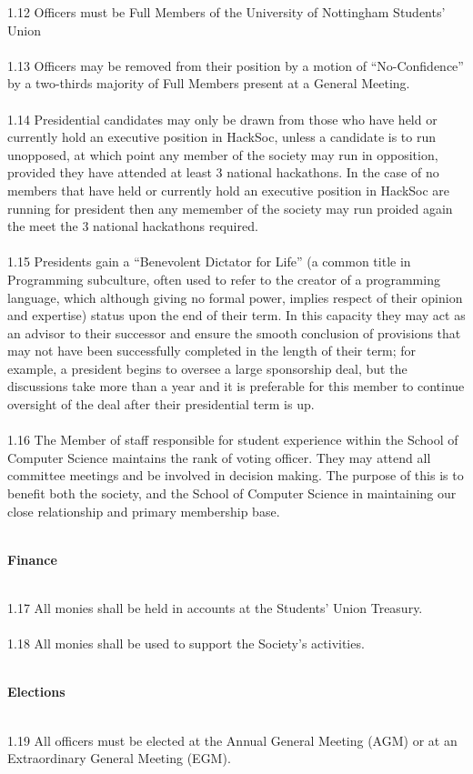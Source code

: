 \documentclass[a4paper,twoside,notitlepage,11pt]{article}
\newcommand{\consHead}[1]{\begin{Large}\textbf{#1}\end{Large}\ \\}
\begin{document}
1.12 Officers must be Full Members of the University of Nottingham Students' Union\ \\
\ \\
1.13 Officers may be removed from their position by a motion of ``No-Confidence'' by a two-thirds majority of Full Members present at a General Meeting.\ \\
\ \\
1.14 Presidential candidates may only be drawn from those who have held or currently hold an executive position in HackSoc, unless a candidate is to run unopposed, at which point any member of the society may run in opposition, provided they have attended at least 3 national hackathons. In the case of no members that have held or currently hold an executive position in HackSoc are running for president then any memember of the society may run proided again the meet the 3 national hackathons required.\ \\
\ \\
1.15 Presidents gain a ``Benevolent Dictator for Life'' (a common title in Programming subculture, often used to refer to the creator of a programming language, which although giving no formal power, implies respect of their opinion and expertise) status upon the end of their term. In this capacity they may act as an advisor to their successor and ensure the smooth conclusion of provisions that may not have been successfully completed in the length of their term; for example, a president begins to oversee a large sponsorship deal, but the discussions take more than a year and it is preferable for this member to continue oversight of the deal after their presidential term is up.\ \\
\ \\
1.16 The Member of staff responsible for student experience within the School of Computer Science maintains the rank of voting officer. They may attend all committee meetings and be involved in decision making. The purpose of this is to benefit both the society, and the School of Computer Science in maintaining our close relationship and primary membership base.\ \\
\ \\
\consHead{Finance}
1.17 All monies shall be held in accounts at the Students' Union Treasury.\ \\
\ \\
1.18 All monies shall be used to support the Society's activities.\ \\
\ \\
\consHead{Elections}
1.19 All officers must be elected at the Annual General Meeting (AGM) or at an Extraordinary General Meeting (EGM).\ \\
\end{document}

